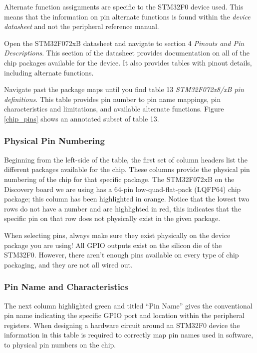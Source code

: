 \documentclass[11pt,fleqn]{book} %
\begin{document}
    Alternate function assignments are specific to the STM32F0 device used. This means that the information on pin alternate functions is found within the \textit{device datasheet} and not the peripheral reference manual.
    
    Open the STM32F072xB datasheet and navigate to section 4 \textit{Pinouts and Pin Descriptions}. This section of the datasheet provides documentation on all of the chip packages available for the device. It also provides tables with pinout details, including alternate functions.
    
    Navigate past the package maps until you find table 13 \textit{STM32F072x8/xB pin definitions}. This table provides pin number to pin name mappings, pin characteristics and limitations, and available alternate functions. Figure \ref{chip_pins} shows an annotated subset of table 13. 
    
    \subsubsection{Physical Pin Numbering}
    Beginning from the left-side of the table, the first set of column headers list the different packages available for the chip. These columns provide the physical pin numbering of the chip for that specific package. The STM32F072xB on the Discovery board we are using has a 64-pin low-quad-flat-pack (LQFP64) chip package; this column has been highlighted in orange. Notice that the lowest two rows do not have a number and are highlighted in red, this indicates that the specific pin on that row does not physically exist in the given package. 
    
    \begin{warning}
        When selecting pins, always make sure they exist physically on the device package you are using! All GPIO outputs exist on the silicon die of the STM32F0. However, there aren't enough pins available on every type of chip packaging, and they are not all wired out.
    \end{warning}

    \subsubsection{Pin Name and Characteristics}
    The next column highlighted green and titled ``Pin Name'' gives the conventional pin name indicating the specific GPIO port and location within the peripheral registers. When designing a hardware circuit around an STM32F0 device the information in this table is required to correctly map pin names used in software, to physical pin numbers on the chip. 
   
\end{document}
